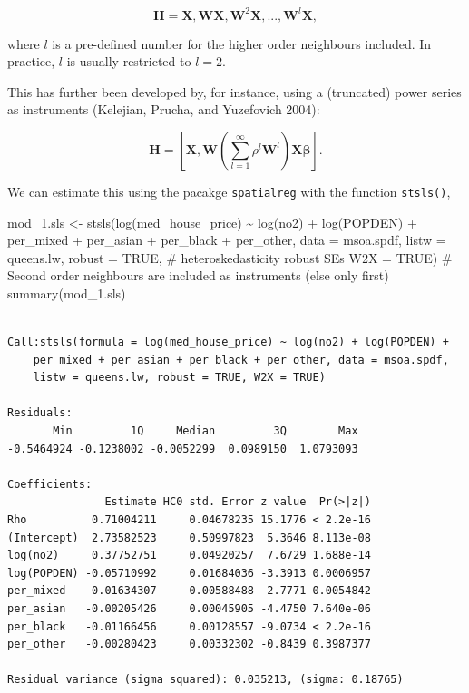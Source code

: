 \documentclass[
  letterpaper,
]{scrbook}
\newenvironment{Shaded}{\begin{snugshade}}{\end{snugshade}}
\newcommand{\AttributeTok}[1]{\textcolor[rgb]{0.40,0.45,0.13}{#1}}
\newcommand{\CommentTok}[1]{\textcolor[rgb]{0.37,0.37,0.37}{#1}}
\newcommand{\ConstantTok}[1]{\textcolor[rgb]{0.56,0.35,0.01}{#1}}
\newcommand{\FunctionTok}[1]{\textcolor[rgb]{0.28,0.35,0.67}{#1}}
\newcommand{\NormalTok}[1]{\textcolor[rgb]{0.00,0.23,0.31}{#1}}
\newcommand{\OtherTok}[1]{\textcolor[rgb]{0.00,0.23,0.31}{#1}}
\newcommand{\SpecialCharTok}[1]{\textcolor[rgb]{0.37,0.37,0.37}{#1}}
\begin{document}
\[
\boldsymbol{\mathbf{H}} = \boldsymbol{\mathbf{X}}, \boldsymbol{\mathbf{W}}\boldsymbol{\mathbf{X}}, \boldsymbol{\mathbf{W}}^2\boldsymbol{\mathbf{X}}, ... , \boldsymbol{\mathbf{W}}^l\boldsymbol{\mathbf{X}},
\]

where \(l\) is a pre-defined number for the higher order neighbours
included. In practice, \(l\) is usually restricted to \(l=2\).

This has further been developed by, for instance, using a (truncated)
power series as instruments (Kelejian, Prucha, and Yuzefovich 2004):

\[
\boldsymbol{\mathbf{H}} =\left[\boldsymbol{\mathbf{X}}, \boldsymbol{\mathbf{W}}\left(\sum_{l = 1}^{\infty}\rho^{l}\boldsymbol{\mathbf{W}}^l\right)\boldsymbol{\mathbf{X}} \boldsymbol{\mathbf{\beta}}\right].
\]

We can estimate this using the pacakge \texttt{spatialreg} with the
function \texttt{stsls()},

\begin{Shaded}
\begin{Highlighting}[]
\NormalTok{mod\_1.sls }\OtherTok{\textless{}{-}} \FunctionTok{stsls}\NormalTok{(}\FunctionTok{log}\NormalTok{(med\_house\_price) }\SpecialCharTok{\textasciitilde{}} \FunctionTok{log}\NormalTok{(no2) }\SpecialCharTok{+} \FunctionTok{log}\NormalTok{(POPDEN) }\SpecialCharTok{+} 
\NormalTok{                     per\_mixed }\SpecialCharTok{+}\NormalTok{ per\_asian }\SpecialCharTok{+}\NormalTok{ per\_black }\SpecialCharTok{+}\NormalTok{ per\_other,  }
                   \AttributeTok{data =}\NormalTok{ msoa.spdf, }
                   \AttributeTok{listw =}\NormalTok{ queens.lw,}
                   \AttributeTok{robust =} \ConstantTok{TRUE}\NormalTok{, }\CommentTok{\#  heteroskedasticity robust SEs}
                   \AttributeTok{W2X =} \ConstantTok{TRUE}\NormalTok{) }\CommentTok{\# Second order neighbours are included as instruments (else only first)}
\FunctionTok{summary}\NormalTok{(mod\_1.sls)}
\end{Highlighting}
\end{Shaded}

\begin{verbatim}

Call:stsls(formula = log(med_house_price) ~ log(no2) + log(POPDEN) + 
    per_mixed + per_asian + per_black + per_other, data = msoa.spdf, 
    listw = queens.lw, robust = TRUE, W2X = TRUE)

Residuals:
       Min         1Q     Median         3Q        Max 
-0.5464924 -0.1238002 -0.0052299  0.0989150  1.0793093 

Coefficients: 
               Estimate HC0 std. Error z value  Pr(>|z|)
Rho          0.71004211     0.04678235 15.1776 < 2.2e-16
(Intercept)  2.73582523     0.50997823  5.3646 8.113e-08
log(no2)     0.37752751     0.04920257  7.6729 1.688e-14
log(POPDEN) -0.05710992     0.01684036 -3.3913 0.0006957
per_mixed    0.01634307     0.00588488  2.7771 0.0054842
per_asian   -0.00205426     0.00045905 -4.4750 7.640e-06
per_black   -0.01166456     0.00128557 -9.0734 < 2.2e-16
per_other   -0.00280423     0.00332302 -0.8439 0.3987377

Residual variance (sigma squared): 0.035213, (sigma: 0.18765)
\end{verbatim}
\end{document}
